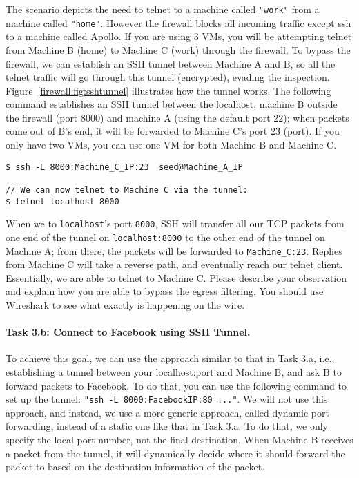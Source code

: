 The scenario depicts the need to telnet to a machine called \texttt{"work"} from a machine called
\texttt{"home"}. However the firewall blocks all incoming traffic except ssh to a machine called
Apollo.
If you are using 3 VMs, you will be attempting telnet from Machine B (home) to Machine C (work)
through the firewall.
To bypass the firewall, we can establish an SSH tunnel between
Machine A and B, so all the telnet traffic will go through this tunnel
(encrypted), evading the inspection. Figure~\ref{firewall:fig:sshtunnel}
illustrates how the tunnel works. 
The following command 
establishes an SSH tunnel between the localhost, machine B outside the firewall (port 8000) and 
machine A (using the default port 22); when packets come out of B's end, it will
be forwarded to Machine C's port 23 (\telnet port). If you only have two VMs,
you can use one VM for both Machine B and Machine C.


\begin{lstlisting}
$ ssh -L 8000:Machine_C_IP:23  seed@Machine_A_IP

// We can now telnet to Machine C via the tunnel:
$ telnet localhost 8000
\end{lstlisting}

When we \telnet to \texttt{localhost}'s port \texttt{8000},  
SSH will transfer all our TCP packets from
one end of the tunnel on \texttt{localhost:8000} to the other end of the tunnel
on Machine A; from there,
the packets will be forwarded to \texttt{Machine\_C:23}. Replies from Machine C will
take a reverse path, and eventually reach our telnet client.
Essentially, we are able to telnet to Machine C.
Please describe your observation and explain how you are able to 
bypass the egress filtering. You should use Wireshark to see
what exactly is happening on the wire.



\paragraph{Task 3.b: Connect to Facebook using SSH Tunnel.}
To achieve this goal, we can use the approach similar to that in 
Task 3.a, i.e., establishing a tunnel between your localhost:port
and Machine B, and ask B to forward packets to Facebook. To do 
that, you can use the following command to set up the tunnel:
{\tt "ssh -L 8000:FacebookIP:80 ..."}. 
We will not use this approach, and instead, we 
use a more generic approach, called dynamic port forwarding, instead of a static one
like that in Task 3.a. To do that, we only specify the local
port number, not the final destination. When Machine B receives
a packet from the tunnel, it will dynamically decide where it should 
forward the packet to based on the destination information of
the packet.


